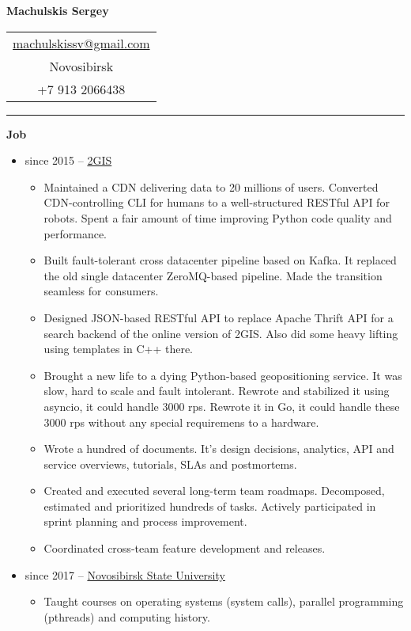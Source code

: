 \documentclass[final]{letter}
\begin{document}
\begin{center}

{\fontsize{25}{40}\selectfont\bf{Machulskis Sergey}}
  {\hfill
    \begin{tabular}{c}
        \href{mailto:machulskissv@gmail.com}{machulskissv@gmail.com}\\
        Novosibirsk \\
        +7 913 2066438\\
     \end{tabular}
  }
\rule{.98\textwidth}{1pt}

\addvspace{.1cm}

\end{center}

{\bf Job}
\begin{itemize}
  \item since 2015 -- \href{https://2gis.com}{2GIS}
  \begin{itemize}
  \item Maintained a CDN delivering data to 20 millions of users.
    Converted CDN-controlling CLI for humans to a well-structured RESTful API for robots.
    Spent a fair amount of time improving Python code quality and performance.
  \item Built fault-tolerant cross datacenter pipeline based on Kafka.
    It replaced the old single datacenter ZeroMQ-based pipeline. Made the transition seamless for consumers.
  \item Designed JSON-based RESTful API to replace Apache Thrift API for a search backend of the online version of 2GIS.
    Also did some heavy lifting using templates in C++ there.
  \item Brought a new life to a dying Python-based geopositioning service. It was slow, hard to scale and fault intolerant.
    Rewrote and stabilized it using asyncio, it could handle 3000 rps.
    Rewrote it in Go, it could handle these 3000 rps without any special requiremens to a hardware.
  \item Wrote a hundred of documents. It's design decisions, analytics, API and service overviews, tutorials, SLAs and postmortems.
  \item Created and executed several long-term team roadmaps. Decomposed, estimated and prioritized hundreds of tasks.
  Actively participated in sprint planning and process improvement.
  \item Coordinated cross-team feature development and releases.
  \end{itemize}

  \item since 2017 -- \href{http://fit.nsu.ru/}{Novosibirsk State University}
    \begin{itemize}
      \item Taught courses on operating systems (system calls), parallel programming (pthreads) and computing history.
    \end{itemize}
  \end{itemize}
\end{document}
